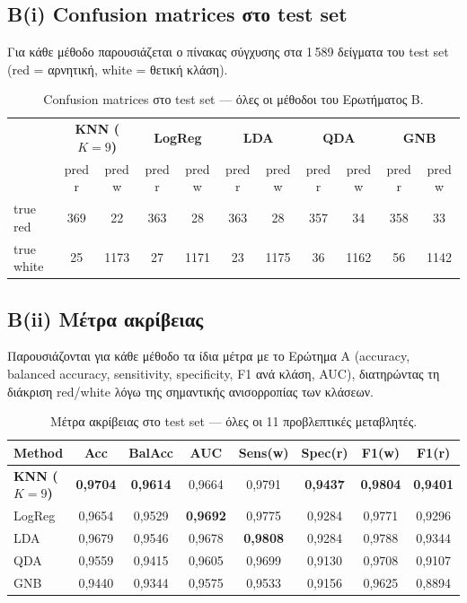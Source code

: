 \documentclass[11pt,a4paper]{article}
\begin{document}
\subsection{Β(i) Confusion matrices στο test set}

Για κάθε μέθοδο παρουσιάζεται ο πίνακας σύγχυσης στα 1\,589 δείγματα
του test set (red = αρνητική, white = θετική κλάση).

\begin{table}[h!]
\centering
\caption{Confusion matrices στο test set — όλες οι μέθοδοι του Ερωτήματος Β.}
\begin{tabular}{lcc|cc|cc|cc|cc}
\toprule
& \multicolumn{2}{c|}{\textbf{KNN ($K=9$)}}
& \multicolumn{2}{c|}{\textbf{LogReg}}
& \multicolumn{2}{c|}{\textbf{LDA}}
& \multicolumn{2}{c|}{\textbf{QDA}}
& \multicolumn{2}{c}{\textbf{GNB}} \\
& pred r & pred w & pred r & pred w & pred r & pred w
& pred r & pred w & pred r & pred w \\
\midrule
true red    & 369 &   22 & 363 &   28 & 363 &   28 & 357 &   34 & 358 &   33 \\
true white  &  25 & 1173 &  27 & 1171 &  23 & 1175 &  36 & 1162 &  56 & 1142 \\
\bottomrule
\end{tabular}
\end{table}

\subsection{Β(ii) Μέτρα ακρίβειας}

Παρουσιάζονται για κάθε μέθοδο τα ίδια μέτρα με το Ερώτημα Α
(accuracy, balanced accuracy, sensitivity, specificity, F1 ανά κλάση,
AUC), διατηρώντας τη διάκριση red/white λόγω της σημαντικής
ανισορροπίας των κλάσεων.

\begin{table}[h!]
\centering
\caption{Μέτρα ακρίβειας στο test set — όλες οι 11 προβλεπτικές μεταβλητές.}
\begin{tabular}{lccccccc}
\toprule
Method & Acc & BalAcc & AUC & Sens(w) & Spec(r) & F1(w) & F1(r) \\
\midrule
\textbf{KNN ($K{=}9$)}  & \textbf{0,9704} & \textbf{0,9614}
                        & 0,9664 & 0,9791 & \textbf{0,9437}
                        & \textbf{0,9804} & \textbf{0,9401} \\
LogReg                  & 0,9654 & 0,9529 & \textbf{0,9692}
                        & 0,9775 & 0,9284 & 0,9771 & 0,9296 \\
LDA                     & 0,9679 & 0,9546 & 0,9678
                        & \textbf{0,9808} & 0,9284 & 0,9788 & 0,9344 \\
QDA                     & 0,9559 & 0,9415 & 0,9605
                        & 0,9699 & 0,9130 & 0,9708 & 0,9107 \\
GNB                     & 0,9440 & 0,9344 & 0,9575
                        & 0,9533 & 0,9156 & 0,9625 & 0,8894 \\
\bottomrule
\end{tabular}
\end{table}
\end{document}

